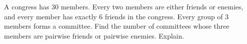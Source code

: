 A congress has $30$ members. Every two members are either friends or enemies, and every member has exactly $6$ friends in the congress. Every group of $3$ members forms a committee. Find the number of committees whose three members are pairwise friends or pairwise enemies. Explain.
